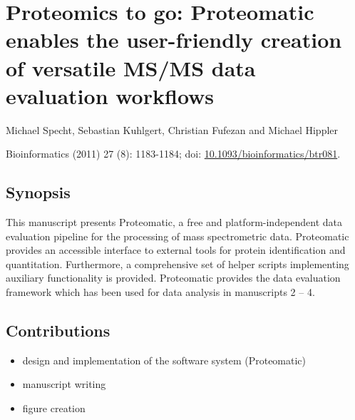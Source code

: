 \cleardoublepage
\section{Proteomics to go: Proteomatic enables the user-friendly creation of versatile MS/MS data evaluation workflows}

Michael Specht, Sebastian Kuhlgert, Christian Fufezan and Michael Hippler

Bioinformatics (2011) 27 (8): 1183-1184; doi: \href{http://dx.doi.org/10.1093/bioinformatics/btr081}{10.1093/bioinformatics/btr081}.

\subsection*{Synopsis}

This manuscript presents Proteomatic, a free and platform-independent data 
evaluation pipeline for the processing of mass spectrometric data. 
Proteomatic provides an accessible interface to external tools for protein
identification and quantitation.
Furthermore, a comprehensive set of helper scripts implementing auxiliary
functionality is provided.
Proteomatic provides the data evaluation framework which has been used for
data analysis in manuscripts 2 -- 4.

\subsection*{Contributions}

\begin{itemize}
\item design and implementation of the software system (Proteomatic)
\item manuscript writing
\item figure creation
\end{itemize}

{}

\cleardoublepage
